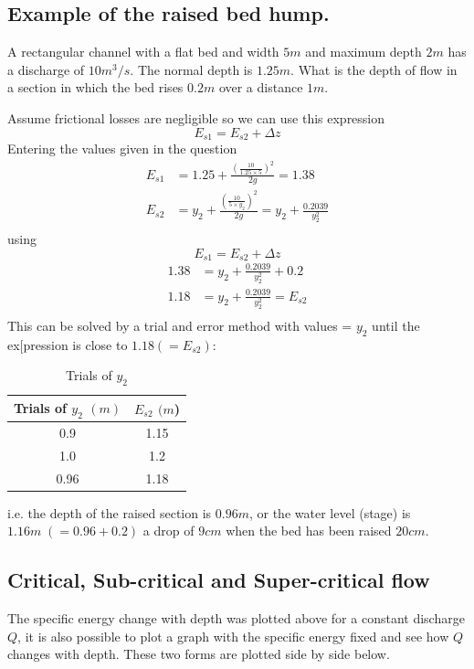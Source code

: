 \documentclass[a4paper, 12pt, british]{article} %
\numberwithin{equation}{section}
\numberwithin{figure}{section}
\numberwithin{table}{section}
\begin{document}
\subsection{Example of the raised bed hump.}

A rectangular channel with a flat bed and width $5m$ and maximum depth $2m$ has a discharge of $10m^3/s$. The normal depth is $1.25 m$. What is the depth of flow in a section in which the bed rises $0.2m$  over a distance $1m$.

Assume frictional losses are negligible so we can use this expression
\begin{equation*}
E_{s1}= E_{s2}+\Delta z
\end{equation*}
Entering the values given in the question
\begin{align*}
E_{s1} &= 1.25 + \frac{\left(\frac{10}{1.25 \times 5}\right)^2}{2g}=1.38 \\
E_{s2} &= y_2 + \frac{\left(\frac{10}{5 \times y_2}\right)^2}{2g}=y_2 + \frac{0.2039}{y_2^2} \\
\end{align*}
using
\begin{equation*}
E_{s1} = E_{s2} + \Delta z 
\end{equation*}
\begin{align*}
1.38 &= y_2 + \frac{0.2039}{y_2^2} +0.2 \\
1.18 &= y_2 + \frac{0.2039}{y_2^2} = E_{s2} \\
\end{align*}
This can be solved by a trial and error method with values = $y_2$ until the ex[pression is  close to $1.18 (=E_{s2})$:

\begin{table}[H]
	\centering
	\begin{tabular}{cc}
		\hline
		Trials of $y_2$ $(m)$ & $E_{s2}$ $(m$) \\
		\hline
		0.9 & 1.15 \\
		1.0 & 1.2 \\
		0.96 & 1.18 \\
		\hline
	\end{tabular}
	\caption{Trials of $y_2$}
	\label{tab:ex31}
\end{table}
i.e. the depth of the raised section is $0.96m $, or the water level (stage) is $1.16m \; (=0.96+0.2)$ a drop of $9cm$ when the bed has been raised $20cm$.

\subsection{Critical, Sub-critical and Super-critical flow}
\label{sec:Es}
The specific energy change with depth was plotted above for a constant discharge $Q$, it is also possible to plot a graph with the specific energy fixed and see how $Q$ changes with depth. These two forms are plotted side by side below.
 
\end{document}
